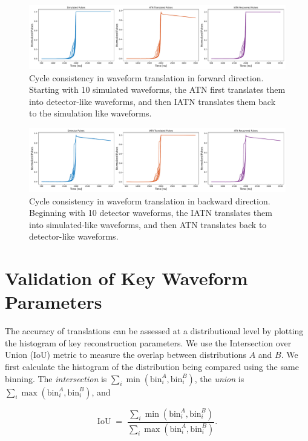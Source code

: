 \begin{figure}%
    \centering
    \includegraphics[width=0.99\linewidth]{ch8/figs/SEP_result_comp_1x3_cycle_BAB.pdf}
    \caption{Cycle consistency in waveform translation in forward direction. Starting with 10 simulated waveforms, the ATN first translates them into detector-like waveforms, and then IATN translates them back to the simulation like waveforms.}
    \label{fig:cycle_bab}
\end{figure}

\begin{figure}%
    \centering
    \includegraphics[width=0.99\linewidth]{ch8/figs/SEP_result_comp_1x3_cycle_ABA.pdf}
    \caption{Cycle consistency in waveform translation in backward direction. Beginning with 10 detector waveforms, the IATN translates them into simulated-like waveforms, and then ATN translates back to detector-like waveforms.}
    \label{fig:cycle_aba}
\end{figure}

\section{Validation of Key Waveform Parameters}
 The accuracy of translations can be assessed at a distributional level by plotting the histogram of key reconstruction parameters. We use the Intersection over Union (IoU) metric to measure the overlap between distributions $A$ and $B$. We first calculate the histogram of the distribution being compared using the same binning. The \textit{intersection} is $\sum_{i} \min(\text{bin}_i^A, \text{bin}_i^B)$, the \textit{union} is $\sum_{i} \max(\text{bin}_i^A, \text{bin}_i^B)$, and
 
\begin{equation}
  \text{IoU} \;=\; \frac{\sum_{i} \min(\text{bin}_i^A, \text{bin}_i^B)}{\sum_{i} \max(\text{bin}_i^A, \text{bin}_i^B)}.    
\end{equation}




